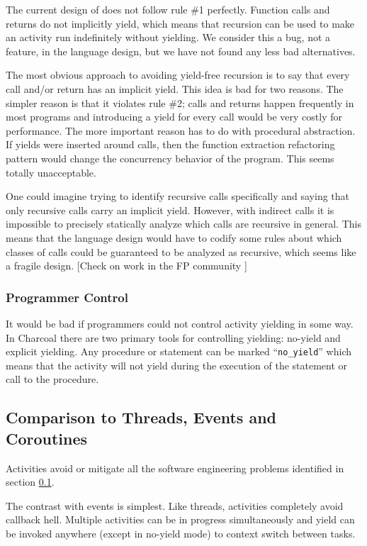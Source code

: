 \documentclass[10pt,preprint]{sigplanconf}
\begin{document}
The current design of \charcoal{} does not follow rule \#1 perfectly.
Function calls and returns do not implicitly yield, which means that recursion can be used to make an activity run indefinitely without yielding.
We consider this a bug, not a feature, in the language design, but we have not found any less bad alternatives.

The most obvious approach to avoiding yield-free recursion is to say that every call and/or return has an implicit yield.
This idea is bad for two reasons.
The simpler reason is that it violates rule \#2; calls and returns happen frequently in most programs and introducing a yield for every call would be very costly for performance.
The more important reason has to do with procedural abstraction.
If yields were inserted around calls, then the function extraction refactoring pattern would change the concurrency behavior of the program.
This seems totally unacceptable.

One could imagine trying to identify recursive calls specifically and saying that only recursive calls carry an implicit yield.
However, with indirect calls it is impossible to precisely statically analyze which calls are recursive in general.
This means that the language design would have to codify some rules about which classes of calls could be guaranteed to be analyzed as recursive, which seems like a fragile design.
[Check on work in the FP community ]

\subsubsection{Programmer Control}

It would be bad if programmers could not control activity yielding in some way.
In Charcoal there are two primary tools for controlling yielding: no-yield and explicit yielding.
Any procedure or statement can be marked ``\texttt{no\_yield}'' which means that the activity will not yield during the execution of the statement or call to the procedure.

\subsection{Comparison to Threads, Events and Coroutines}

Activities avoid or mitigate all the software engineering problems identified in section \ref{}.

The contrast with events is simplest.
Like threads, activities completely avoid callback hell.
Multiple activities can be in progress simultaneously and yield can be invoked anywhere (except in no-yield mode) to context switch between tasks.
\end{document}
